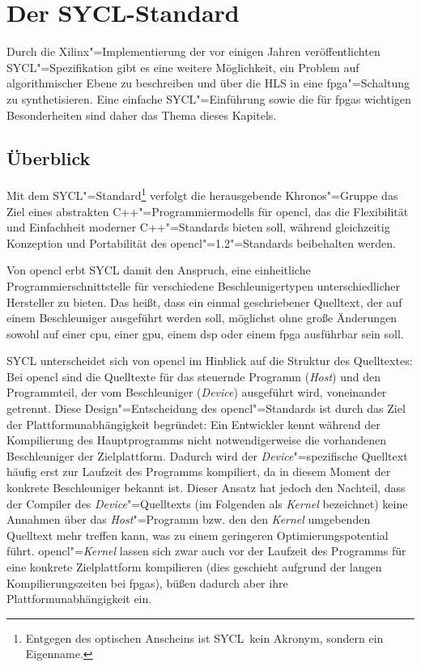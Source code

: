\chapter{Der SYCL-Standard}\label{sycl}

Durch die Xilinx"=Implementierung der vor einigen Jahren veröffentlichten
SYCL"=Spezifikation gibt es eine weitere Möglichkeit, ein Problem auf
algorithmischer Ebene zu beschreiben und über die HLS in eine
\gls{fpga}"=Schaltung zu synthetisieren. Eine einfache SYCL"=Einführung sowie
die für \gls{fpga}s wichtigen Besonderheiten sind daher das Thema dieses
Kapitels.

\section{Überblick}\label{sycl:ueberblick}

Mit dem SYCL"=Standard\footnote{Entgegen des optischen Anscheins ist
\glqq SYCL\grqq\ kein Akronym, sondern ein Eigenname.}\cite[vgl.][]{sycl2019}
verfolgt die herausgebende Khronos"=Gruppe das Ziel eines abstrakten
C++"=Programmiermodells für \gls{opencl}, das die Flexibilität und Einfachheit
moderner C++"=Standards bieten soll, während gleichzeitig Konzeption und
Portabilität des \gls{opencl}"=1.2"=Standards \cite[vgl.][]{opencl2012}
beibehalten werden.

Von \gls{opencl} erbt SYCL damit den Anspruch, eine einheitliche
Programmierschnittstelle für verschiedene Beschleunigertypen unterschiedlicher
Hersteller zu bieten. Das heißt, dass ein einmal geschriebener Quelltext, der
auf einem Beschleuniger ausgeführt werden soll, möglichst ohne große Änderungen
sowohl auf einer \gls{cpu}, einer \gls{gpu}, einem \gls{dsp} oder einem
\gls{fpga} ausführbar sein soll.

SYCL unterscheidet sich von \gls{opencl} im Hinblick auf die Struktur des
Quelltextes: Bei \gls{opencl} sind die Quelltexte für das steuernde Programm
(\textit{Host}) und den Programmteil, der vom Beschleuniger (\textit{Device})
ausgeführt wird, voneinander getrennt. Diese Design"=Entscheidung des
\gls{opencl}"=Standards ist durch das Ziel der Plattformunabhängigkeit
begründet: Ein Entwickler kennt während der Kompilierung des Hauptprogramms
nicht notwendigerweise die vorhandenen Beschleuniger der Zielplattform. Dadurch
wird der \textit{Device}"=spezifische Quelltext häufig erst zur Laufzeit des
Programms kompiliert, da in diesem Moment der konkrete Beschleuniger bekannt
ist. Dieser Ansatz hat jedoch den Nachteil, dass der Compiler des
\textit{Device}"=Quelltexts (im Folgenden als \textit{Kernel} bezeichnet) keine
Annahmen über das \textit{Host}"=Programm bzw. den den \textit{Kernel}
umgebenden Quelltext mehr treffen kann, was zu einem geringeren
Optimierungspotential führt. \gls{opencl}"=\textit{Kernel} lassen sich zwar auch
vor der Laufzeit des Programms für eine konkrete Zielplattform kompilieren (dies
geschieht aufgrund der langen Kompilierungszeiten bei \gls{fpga}s), büßen
dadurch aber ihre Plattformunabhängigkeit ein.

